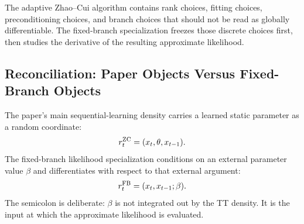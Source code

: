 \documentclass[11pt]{article}
\numberwithin{equation}{section}
\begin{document}
The adaptive Zhao--Cui algorithm contains rank choices, fitting choices,
preconditioning choices, and branch choices that should not be read as globally
differentiable.  The fixed-branch specialization freezes those discrete choices
first, then studies the derivative of the resulting approximate likelihood.

\subsection*{Reconciliation: Paper Objects Versus Fixed-Branch Objects}

The paper's main sequential-learning density carries a learned static
parameter as a random coordinate:
\begin{equation}
    r_t^{\rm ZC}=(x_t,\theta,x_{t-1}).
    \label{eq:p24-r1}
\end{equation}
The fixed-branch likelihood specialization conditions on an external parameter value
\(\beta\) and differentiates with respect to that external argument:
\begin{equation}
    r_t^{\rm FB}=(x_t,x_{t-1};\beta).
    \label{eq:p24-r2}
\end{equation}
The semicolon is deliberate: \(\beta\) is not integrated out by the TT density.
It is the input at which the approximate likelihood is evaluated.
\end{document}
